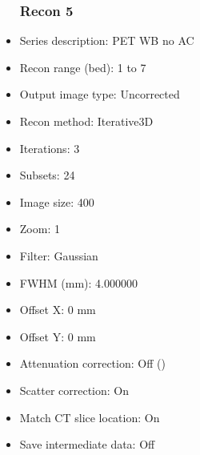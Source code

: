 \documentclass[12pt]{article}
\begin{document}
\begin{itemize}
\subsubsection{Recon 5}
\item Series description: PET WB no AC
\item Recon range (bed): 1 to 7
\item Output image type: Uncorrected
\item Recon method: Iterative3D
\item Iterations: 3
\item Subsets: 24
\item Image size: 400
\item Zoom: 1
\item Filter: Gaussian
\item FWHM (mm): 4.000000
\item Offset X: 0 mm
\item Offset Y: 0 mm
\item Attenuation correction: Off ()
\item Scatter correction: On
\item Match CT slice location: On
\item Save intermediate data: Off
\end{itemize}
\end{document}
